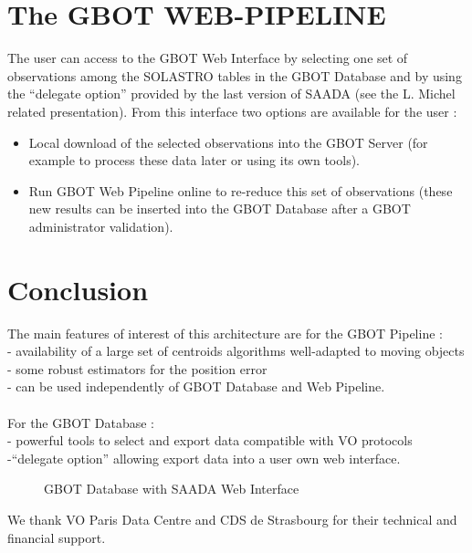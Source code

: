 \section{The GBOT WEB-PIPELINE}
The user can access to the GBOT Web Interface by selecting one set of observations among the SOLASTRO tables
in the GBOT Database and by using the “delegate option” provided by the last version of SAADA
(see the L. Michel related presentation). From this interface two options are available for the user :
\begin{itemize}
\item Local download of the selected observations into the GBOT Server
(for example to process these data later or using its own tools).\\
\item Run GBOT Web Pipeline online to re-reduce this set of observations
(these new results can be inserted into the GBOT Database after a GBOT administrator validation).
\end{itemize}

\section{Conclusion}
The main features of interest of this architecture  are for the GBOT Pipeline :\\
\hspace*{0.25cm}- availability of a large set of centroids algorithms well-adapted to moving objects\\
\hspace*{0.25cm}- some robust estimators for the position error \\
\hspace*{0.25cm}- can be used independently of GBOT Database and Web Pipeline.\\\\
For the GBOT Database : \\
\hspace*{0.25cm}- powerful tools to select and export data compatible with VO protocols \\
\hspace*{0.25cm}-“delegate option” allowing export data into a user own web interface.

\begin{figure}[ht]
\caption{GBOT Database with SAADA Web Interface} \label{P03-fig-1}
\end{figure}



\acknowledgements 
We thank VO Paris Data Centre and CDS de Strasbourg for their technical and financial support.



